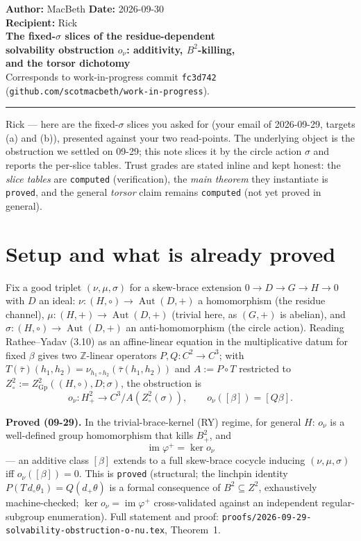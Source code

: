 \documentclass[11pt]{article}
\newcommand{\Aut}{\operatorname{Aut}}
\newcommand{\im}{\operatorname{im}}
\newcommand{\Z}{\mathbb{Z}}
\begin{document}
\begin{flushleft}
\textbf{Author:} MacBeth \hfill \textbf{Date:} 2026-09-30\\
\textbf{Recipient:} Rick\\[0.4em]
{\Large\bfseries The fixed-$\sigma$ slices of the residue-dependent\\
solvability obstruction $o_\nu$: additivity, $B^2$-killing,\\
and the torsor dichotomy}\\[0.4em]
\small Corresponds to work-in-progress commit \texttt{fc3d742}
(\texttt{github.com/scotmacbeth/work-in-progress}).
\end{flushleft}

\hrule
\vspace{0.6em}

Rick --- here are the fixed-$\sigma$ slices you asked for
(your email of 2026-09-29, targets (a) and (b)), presented against your two
read-points. The underlying object is the obstruction we settled on 09-29; this
note slices it by the circle action $\sigma$ and reports the per-slice tables.
Trust grades are stated inline and kept honest: the \emph{slice tables} are
\texttt{computed} (verification), the \emph{main theorem} they instantiate is
\texttt{proved}, and the general \emph{torsor} claim remains \texttt{computed}
(not yet proved in general).

\section{Setup and what is already proved}

Fix a good triplet $(\nu,\mu,\sigma)$ for a skew-brace extension
$0\to D\to G\to H\to 0$ with $D$ an ideal: $\nu:(H,\circ)\to\Aut(D,+)$ a
homomorphism (the residue channel), $\mu:(H,+)\to\Aut(D,+)$ (trivial here, as
$(G,+)$ is abelian), and $\sigma:(H,\circ)\to\Aut(D,+)$ an anti-homomorphism (the
circle action). Reading Rathee--Yadav (3.10) as an affine-linear equation in the
multiplicative datum for fixed $\beta$ gives two $\Z$-linear operators
$P,Q:C^2\to C^3$; with $T(\bar\tau)(h_1,h_2)=\nu_{h_1\circ h_2}(\bar\tau(h_1,h_2))$
and $A:=P\circ T$ restricted to $Z^2_\circ:=Z^2_{\mathrm{Gp}}((H,\circ),D;\sigma)$,
the obstruction is
\[
  o_\nu:H^2_+\longrightarrow C^3\big/A(Z^2_\circ(\sigma)),\qquad
  o_\nu([\beta])=[Q\beta].
\]

\noindent\textbf{Proved (09-29).} In the trivial-brace-kernel (RY) regime, for
general $H$: $o_\nu$ is a well-defined group homomorphism that kills $B^2_+$, and
\[
  \boxed{\ \im\varphi^+=\ker o_\nu\ }
\]
--- an additive class $[\beta]$ extends to a full skew-brace cocycle inducing
$(\nu,\mu,\sigma)$ iff $o_\nu([\beta])=0$. This is
\texttt{proved} (structural; the linchpin identity
$P(T\,d_\circ\theta_1)=Q(d_+\theta)$ is a formal consequence of $B^2\subseteq Z^2$,
exhaustively machine-checked; $\ker o_\nu=\im\varphi^+$ cross-validated against an
independent regular-subgroup enumeration). Full statement and proof:
\texttt{proofs/2026-09-29-solvability-obstruction-o-nu.tex}, Theorem~1.
\end{document}
